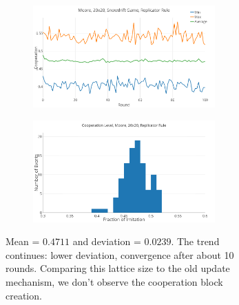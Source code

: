 \documentclass[a4paper, 11pt]{article}
\begin{document}
\begin{figure}[H]
\begin{subfigure}{.55\textwidth}
	\begin{subfigure}{1\textwidth}
		\includegraphics[width=1\linewidth]{SDMoore20x20}
	\end{subfigure}

	\begin{subfigure}{1\textwidth}
		\includegraphics[width=1\linewidth]{SDMoore20x20HG}
	\end{subfigure}
\end{subfigure}%
\begin{subfigure}{.45\textwidth}
	Mean = $0.4711$ and deviation = $0.0239$. The trend continues: lower deviation, convergence after about 10 rounds. Comparing this lattice size to the old update mechanism, we don't observe the cooperation block creation.
\end{subfigure}

\end{figure}





\newpage
\end{document}

